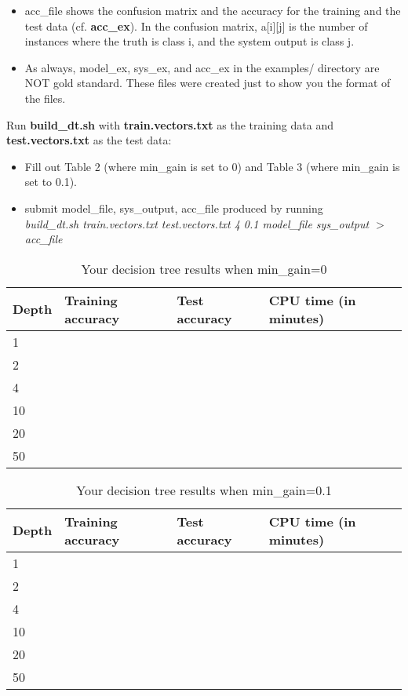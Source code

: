 \documentclass[11pt]{article}
\begin{document}
\begin{itemize}
  \item acc\_file shows the confusion matrix and the accuracy for
       the training and the test data (cf. {\bf acc\_ex}).
       In the confusion matrix, a[i][j] is the number of instances
        where the truth is class i, and the system output is class j.

   \item As always, model\_ex, sys\_ex, and acc\_ex in the examples/ directory
         are NOT gold standard.
        These files were created just to show you the format of the files.
\end{itemize}

\hspace{0.2in}

Run {\bf build\_dt.sh} 
with {\bf train.vectors.txt} as the 
training data and {\bf test.vectors.txt} as the test data:
\begin{itemize}
  \item Fill out Table 2 (where min\_gain is set to 0) and Table 3 
    (where min\_gain is set to 0.1).
  \item submit model\_file, sys\_output, acc\_file produced by running \\
    {\it build\_dt.sh train.vectors.txt test.vectors.txt 4 0.1 model\_file sys\_output $>$ acc\_file}
\end{itemize}


\begin{table}[hbtp]
\centering
\caption{Your decision tree results when min\_gain=0}
\label{table2}
\begin{tabular}{|l|l|l|l|} \hline
Depth   & Training accuracy & Test accuracy & CPU time (in minutes)\\ \hline
1       &  &  &  \\ \hline
2       &  &  &  \\ \hline
4       &  &  &  \\ \hline
10      &  &  &  \\ \hline
20      &  &  &  \\ \hline
50      &  &  &       \\ \hline
\end{tabular}
\end{table}


\begin{table}[hbtp]
\centering
\caption{Your decision tree results when min\_gain=0.1}
\label{table3}
\begin{tabular}{|l|l|l|l|} \hline
Depth   & Training accuracy & Test accuracy & CPU time (in minutes)\\ \hline
1       &  &  &  \\ \hline
2       &  &  &  \\ \hline
4       &  &  &  \\ \hline
10      &  &  &  \\ \hline
20      &  &  &  \\ \hline
50      &  &  &       \\ \hline
\end{tabular}
\end{table}
\end{document}
